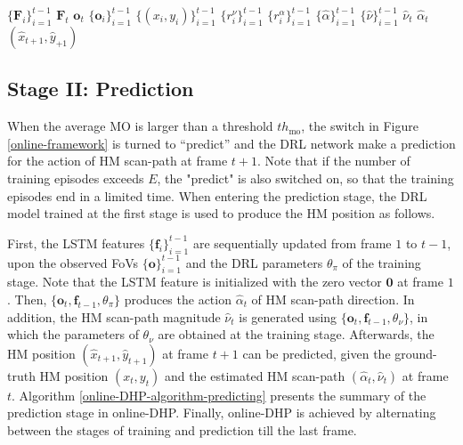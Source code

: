 \documentclass[10pt,journal,compsoc]{IEEEtran}
\begin{document}
$\{\mathbf{F}_i\}_{i=1}^{t-1}$
$\mathbf{F}_t$
$\mathbf{o}_t$
$\{\mathbf{o}_i\}_{i=1}^{t-1}$
$\{(x_i,y_i)\}_{i=1}^{t-1}$
$\{r_i^{\nu}\}_{i=1}^{t-1}$
$\{r_i^{\alpha}\}_{i=1}^{t-1}$
$\{\hat{\alpha}\}_{i=1}^{t-1}$ 
$\{\hat{\nu}\}_{i=1}^{t-1}$ 
$\hat{\nu}_t$ 
$\hat{\alpha}_t$
$(\hat{x}_{t+1},\hat{y}_{+1})$
\subsection{Stage II: Prediction}
When the average MO is larger than a threshold $th_{\text{mo}}$, the switch in Figure \ref{online-framework} is turned to ``predict'' and the DRL network make a prediction for the action of HM scan-path at frame $t+1$.
Note that if the number of training episodes exceeds $E$, the "predict" is also switched on, so that the training episodes end in a limited time.
When entering the prediction stage, the DRL model trained at the first stage is used to produce the HM position as follows.

First, the LSTM features $\{\mathbf{f}_i\}_{i=1}^{t-1}$ are sequentially updated from frame $1$ to $t-1$, upon the observed FoVs $\{\mathbf{o}\}_{i=1}^{t-1}$ and the DRL parameters $\theta_{\pi}$ of the training stage. Note that the LSTM feature is initialized with the zero vector $\mathbf{0}$ at frame $1$. Then, $\{\mathbf{o}_t, \mathbf{f}_{t-1}, \theta_{\pi}\}$ produces the action $\hat{\alpha}_t$ of HM scan-path direction. In addition, the HM scan-path magnitude $\hat{\nu}_t$ is generated using $\{\mathbf{o}_t, \mathbf{f}_{t-1}, \theta_{\nu}\}$, in which the parameters of $\theta_{\nu}$ are obtained at the training stage. Afterwards, the HM position $(\hat{x}_{t+1}, \hat{y}_{t+1})$ at frame $t+1$ can be predicted, given the ground-truth HM position $(\!x_{t}, \!y_{t}\!)$ and the estimated HM scan-path $(\hat{\alpha}_t, \hat{\nu}_t)$ at frame $t$. Algorithm \ref{online-DHP-algorithm-predicting} presents the summary of the prediction stage in online-DHP. Finally, online-DHP is achieved by alternating between the stages of training and prediction till the last frame.
\end{document}
